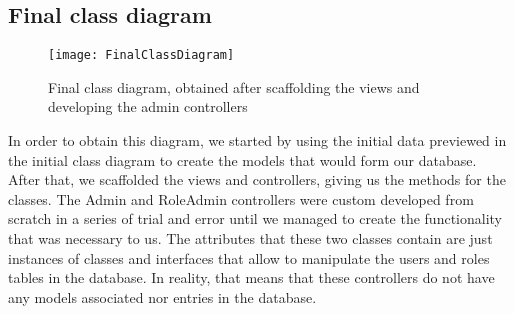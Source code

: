   \subsection{Final class diagram}
  \begin{figure}[ht]
    \centering
    \texttt{[image: FinalClassDiagram]}
    \caption{Final class diagram, obtained after scaffolding the
    views and developing the admin controllers}
  \end{figure}
  
  In order to obtain this diagram, we started by using the initial data previewed in the initial
  class diagram to create the models that would form our database. After that, we scaffolded the
  views and controllers, giving us the methods for the classes. The Admin and RoleAdmin controllers
  were custom developed from scratch in a series of trial and error until we managed to create
  the functionality that was necessary to us. The attributes that these two classes contain are
  just instances of classes and interfaces that allow to manipulate the users and roles tables
  in the database. In reality, that means that these controllers do not have any models associated
  nor entries in the database.
